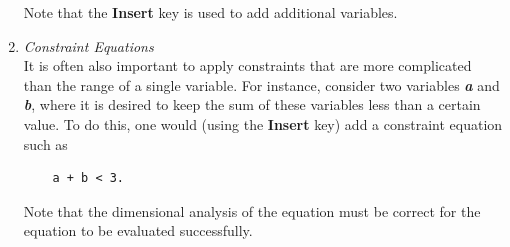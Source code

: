 \begin{enumerate}
    Note that the \textbf{Insert} key is used to add additional variables.

  \item \textit{Constraint Equations}\\
    It is often also important to apply constraints that are more complicated
    than the range of a single variable.  For instance, consider two variables
    \textbf{\textit{a}} and \textbf{\textit{b}}, where it is desired to keep the
    sum of these variables less than a certain value.  To do this, one would
    (using the \textbf{Insert} key) add a constraint equation such as
    \begin{lstlisting}
    a + b < 3.
    \end{lstlisting}
    Note that the dimensional analysis of the equation must be correct for the
    equation to be evaluated successfully.
\end{enumerate}
